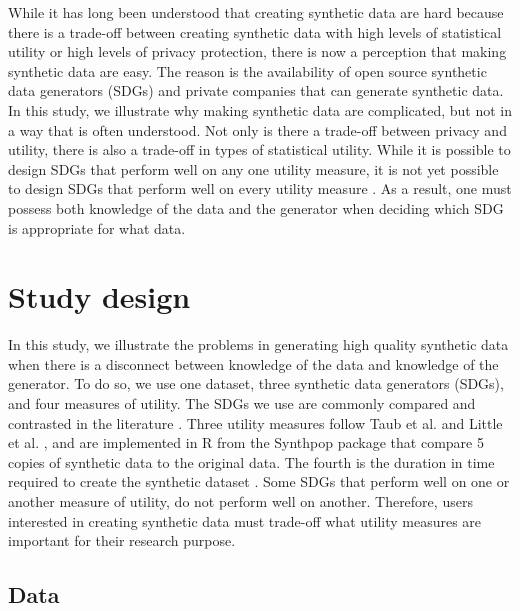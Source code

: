 \documentclass[runningheads]{llncs}
\newcommand{\mn}[1]{\scriptsize {\bf \color{blue}[MN: #1]}\normalsize}
\begin{document}

While it has long been understood that creating synthetic data are hard because there is a trade-off between creating synthetic data with high levels of statistical utility or high levels of privacy protection, there is now a perception that making synthetic data are easy.  The reason is the availability of open source synthetic data generators (SDGs) and private companies that can generate synthetic data.  In this study, we illustrate why making synthetic data are complicated, but not in a way that is often understood.  Not only is there a trade-off between privacy and utility, there is also a trade-off in types of statistical utility.  While it is possible to design SDGs that perform well on any one utility measure, it is not yet possible to design SDGs that perform well on every utility measure \cite{drechsler2022challenges,jordon2022synthetic}.  As a result, one must possess both knowledge of the data and the generator when deciding which SDG is appropriate for what data.  

\section{Study design}\label{sec:study_design}

In this study, we illustrate the problems in generating high quality synthetic data when there is a disconnect between knowledge of the data and knowledge of the generator.  To do so, we use one dataset, three synthetic data generators (SDGs), and four measures of utility.  The SDGs we use are commonly compared and contrasted in the literature \cite{dankar2021fake,little2022comparing}.  Three utility measures follow Taub et al. \cite{taub2020impact} and Little et al. \cite{little2022comparing}, and are implemented in \textsf{R} from the Synthpop package \cite{nowok2016synthpop} that compare 5 copies of synthetic data to the original data.  The fourth is the duration in time required to create the synthetic dataset \cite{jordon2022synthetic}. Some SDGs that perform well on one or another measure of utility, do not perform well on another. Therefore, users interested in creating synthetic data must trade-off what utility measures are important for their research purpose.

\subsection{Data}
\end{document}
